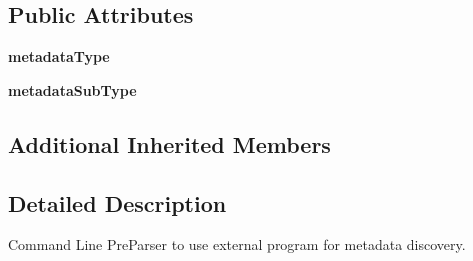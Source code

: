 \subsection*{Public Attributes}
\begin{DoxyCompactItemize}
\item 
\hypertarget{classcheshire3_1_1formats_1_1pre_parser_1_1_cmd_line_metadata_discovery_pre_parser_adde16a1cde30d05af43015dbf83d32de}{{\bfseries metadata\-Type}}\label{classcheshire3_1_1formats_1_1pre_parser_1_1_cmd_line_metadata_discovery_pre_parser_adde16a1cde30d05af43015dbf83d32de}

\item 
\hypertarget{classcheshire3_1_1formats_1_1pre_parser_1_1_cmd_line_metadata_discovery_pre_parser_a39674651756cef347a99d89e63a821ab}{{\bfseries metadata\-Sub\-Type}}\label{classcheshire3_1_1formats_1_1pre_parser_1_1_cmd_line_metadata_discovery_pre_parser_a39674651756cef347a99d89e63a821ab}

\end{DoxyCompactItemize}
\subsection*{Additional Inherited Members}


\subsection{Detailed Description}
\begin{DoxyVerb}Command Line PreParser to use external program for metadata discovery.\end{DoxyVerb}
 

